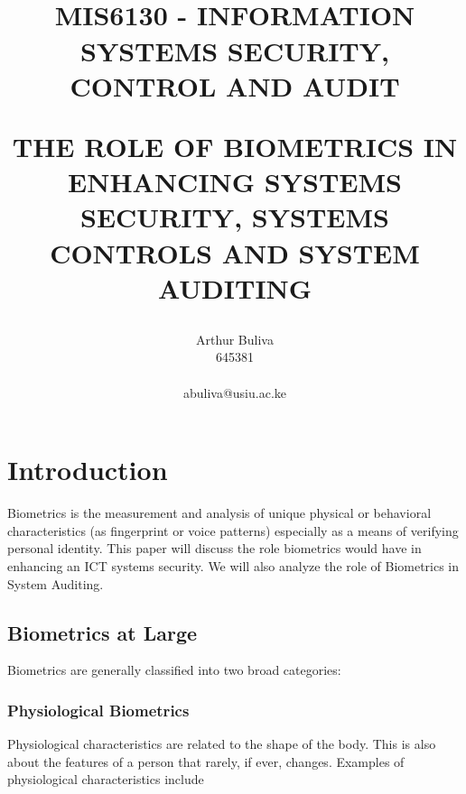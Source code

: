 \documentclass[12pt]{report}
\begin{document}
\title{
\begin{center}
\begin{normalsize}
\textbf{}\end{normalsize}\\
\vfill
\textbf{ MIS6130 - INFORMATION SYSTEMS SECURITY, CONTROL
AND AUDIT} \\
\vspace{1in}
\author{Arthur Buliva\\645381\\\begin{small}abuliva@usiu.ac.ke\end{small}}
\begin{footnotesize}
	\textbf{THE ROLE OF BIOMETRICS IN ENHANCING SYSTEMS SECURITY, SYSTEMS CONTROLS AND SYSTEM AUDITING}
	\vfill
	\end{footnotesize}
\end{center}
}

\maketitle

\tableofcontents

\pagestyle{fancy}

\chapter{Introduction}

Biometrics is the measurement and analysis of unique physical or behavioral characteristics (as fingerprint or voice patterns) especially as a means of verifying personal identity. This paper will discuss the role biometrics would have in enhancing an ICT systems security. We will also analyze the role of Biometrics in System Auditing.

\section{Biometrics at Large}

Biometrics are generally classified into two broad categories:

\subsection{Physiological Biometrics}

Physiological characteristics are related to the shape of the body. This is also about the features of a person that rarely, if ever, changes. Examples of physiological characteristics include
\end{document}
